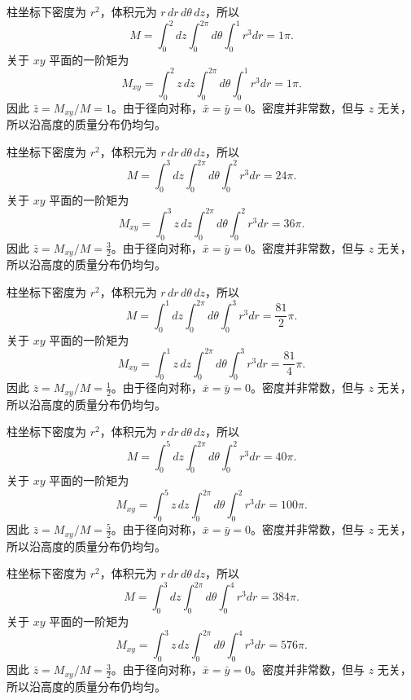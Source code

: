 \documentclass[UTF8,12pt,a4paper,fontset=fandol]{ctexart}
\begin{document}
\begin{solve}\label{ans:c38q19}
柱坐标下密度为 $r^2$，体积元为 $r\,dr\,d\theta\,dz$，所以
\[
M=\int_0^{2}dz\int_0^{2\pi}d\theta\int_0^{1}r^3dr=1\pi.
\]
关于 $xy$ 平面的一阶矩为
\[
M_{xy}=\int_0^{2}z\,dz\int_0^{2\pi}d\theta\int_0^{1}r^3dr=1\pi.
\]
因此 $\bar z=M_{xy}/M=1$。由于径向对称，$\bar x=\bar y=0$。密度并非常数，但与 $z$ 无关，所以沿高度的质量分布仍均匀。
\end{solve}

\begin{solve}\label{ans:c38q20}
柱坐标下密度为 $r^2$，体积元为 $r\,dr\,d\theta\,dz$，所以
\[
M=\int_0^{3}dz\int_0^{2\pi}d\theta\int_0^{2}r^3dr=24\pi.
\]
关于 $xy$ 平面的一阶矩为
\[
M_{xy}=\int_0^{3}z\,dz\int_0^{2\pi}d\theta\int_0^{2}r^3dr=36\pi.
\]
因此 $\bar z=M_{xy}/M=\frac{3}{2}$。由于径向对称，$\bar x=\bar y=0$。密度并非常数，但与 $z$ 无关，所以沿高度的质量分布仍均匀。
\end{solve}

\begin{solve}\label{ans:c38q21}
柱坐标下密度为 $r^2$，体积元为 $r\,dr\,d\theta\,dz$，所以
\[
M=\int_0^{1}dz\int_0^{2\pi}d\theta\int_0^{3}r^3dr=\frac{81}{2}\pi.
\]
关于 $xy$ 平面的一阶矩为
\[
M_{xy}=\int_0^{1}z\,dz\int_0^{2\pi}d\theta\int_0^{3}r^3dr=\frac{81}{4}\pi.
\]
因此 $\bar z=M_{xy}/M=\frac{1}{2}$。由于径向对称，$\bar x=\bar y=0$。密度并非常数，但与 $z$ 无关，所以沿高度的质量分布仍均匀。
\end{solve}

\begin{solve}\label{ans:c38q22}
柱坐标下密度为 $r^2$，体积元为 $r\,dr\,d\theta\,dz$，所以
\[
M=\int_0^{5}dz\int_0^{2\pi}d\theta\int_0^{2}r^3dr=40\pi.
\]
关于 $xy$ 平面的一阶矩为
\[
M_{xy}=\int_0^{5}z\,dz\int_0^{2\pi}d\theta\int_0^{2}r^3dr=100\pi.
\]
因此 $\bar z=M_{xy}/M=\frac{5}{2}$。由于径向对称，$\bar x=\bar y=0$。密度并非常数，但与 $z$ 无关，所以沿高度的质量分布仍均匀。
\end{solve}

\begin{solve}\label{ans:c38q23}
柱坐标下密度为 $r^2$，体积元为 $r\,dr\,d\theta\,dz$，所以
\[
M=\int_0^{3}dz\int_0^{2\pi}d\theta\int_0^{4}r^3dr=384\pi.
\]
关于 $xy$ 平面的一阶矩为
\[
M_{xy}=\int_0^{3}z\,dz\int_0^{2\pi}d\theta\int_0^{4}r^3dr=576\pi.
\]
因此 $\bar z=M_{xy}/M=\frac{3}{2}$。由于径向对称，$\bar x=\bar y=0$。密度并非常数，但与 $z$ 无关，所以沿高度的质量分布仍均匀。
\end{solve}
\end{document}
